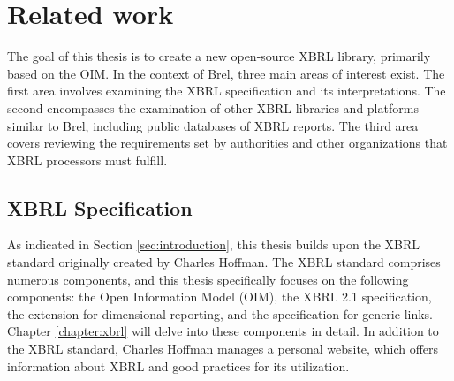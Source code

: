 \chapter{Related work}
\label{sec:related_work}

The goal of this thesis is to create a new open-source XBRL library, primarily based on the OIM.
In the context of Brel, three main areas of interest exist.
The first area involves examining the XBRL specification and its interpretations.
The second encompasses the examination of other XBRL libraries and platforms similar to Brel, including public databases of XBRL reports.
The third area covers reviewing the requirements set by authorities and other organizations that XBRL processors must fulfill.

\section{XBRL Specification}
As indicated in Section \ref{sec:introduction}, this thesis builds upon the XBRL standard originally created by Charles Hoffman\cite{xbrl}.
The XBRL standard comprises numerous components, and this thesis specifically focuses on the following components: 
the Open Information Model (OIM)\cite{oim}, 
the XBRL 2.1 specification\cite{xbrl21}, 
the extension for dimensional reporting\cite{xbrl_dimensions}, 
and the specification for generic links\cite{xbrl_generic_links}.
Chapter \ref{chapter:xbrl} will delve into these components in detail.
In addition to the XBRL standard, Charles Hoffman manages a personal website\cite{seattle_method},
which offers information about XBRL and good practices for its utilization.

